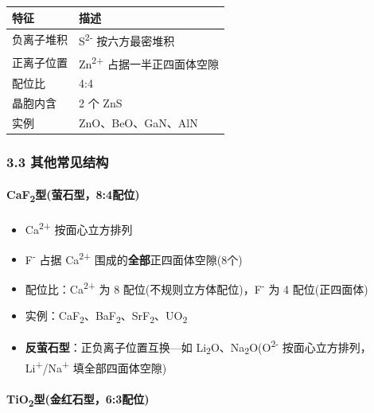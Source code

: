 {\def\LTcaptype{none} %
\begin{longtable}[]{@{}ll@{}}
\toprule\noalign{}
特征 & 描述 \\
\midrule\noalign{}
\endhead
\bottomrule\noalign{}
\endlastfoot
负离子堆积 & S\textsuperscript{2-} 按六方最密堆积 \\
正离子位置 & Zn\textsuperscript{2+} 占据一半正四面体空隙 \\
配位比 & 4:4 \\
晶胞内含 & 2 个 ZnS \\
实例 & ZnO、BeO、GaN、AlN \\
\end{longtable}
}

\subsubsection{3.3 其他常见结构}\label{ux5176ux4ed6ux5e38ux89c1ux7ed3ux6784}

\paragraph{\texorpdfstring{CaF\textsubscript{2}型(萤石型，8:4配位)}{CaF2型(萤石型，8:4配位)}}\label{caf2ux578bux8424ux77f3ux578b84ux914dux4f4d}

\begin{itemize}
\tightlist
\item
  Ca\textsuperscript{2+} 按面心立方排列
\item
  F\textsuperscript{-} 占据 Ca\textsuperscript{2+} 围成的\textbf{全部}正四面体空隙(8个)
\item
  配位比：Ca\textsuperscript{2+} 为 8 配位(不规则立方体配位)，F\textsuperscript{-} 为 4 配位(正四面体)
\item
  实例：CaF\textsubscript{2}、BaF\textsubscript{2}、SrF\textsubscript{2}、UO\textsubscript{2}
\item
  \textbf{反萤石型}：正负离子位置互换---如 Li\textsubscript{2}O、Na\textsubscript{2}O(O\textsuperscript{2-} 按面心立方排列，Li\textsuperscript{+}/Na\textsuperscript{+} 填全部四面体空隙)
\end{itemize}

\paragraph{\texorpdfstring{TiO\textsubscript{2}型(金红石型，6:3配位)}{TiO2型(金红石型，6:3配位)}}\label{tio2ux578bux91d1ux7ea2ux77f3ux578b63ux914dux4f4d}


